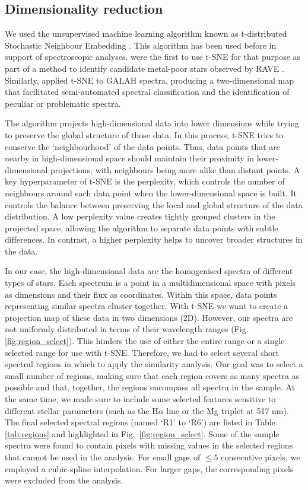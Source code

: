\documentclass{aa}
\begin{document}
\subsection{Dimensionality reduction}

We used the unsupervised machine learning algorithm known as t-distributed Stochastic Neighbour Embedding \cite[t-SNE,][]{JMLR:v9:vandermaaten08a}. This algorithm has been used before in support of spectroscopic analyses. \citet{Matijevic2017} were the first to use t-SNE for that purpose as part of a method to identify candidate metal-poor stars observed by RAVE \cite[The Radial Velocity Experiment,][]{Steinmetz2020}. Similarly, \citet{Traven2017} applied t-SNE to GALAH spectra, producing a two-dimensional map that facilitated semi-automated spectral classification and the identification of peculiar or problematic spectra. 

The algorithm projects high-dimensional data into lower dimensions while trying to preserve the global structure of those data. In this process, t-SNE tries to conserve the `neighbourhood' of the data points. Thus, data points that are nearby in high-dimensional space should maintain their proximity in lower-dimensional projections, with neighbours being more alike than distant points. A key hyperparameter of t-SNE is the perplexity, which controls the number of neighbours around each data point when the lower-dimensional space is built. It controls the balance between preserving the local and global structure of the data distribution. A low perplexity value creates tightly grouped clusters in the projected space, allowing the algorithm to separate data points with subtle differences. In contrast, a higher perplexity helps to uncover broader structures in the data.

In our case, the high-dimensional data are the homogenised spectra of different types of stars. Each spectrum is a point in a multidimensional space with pixels as dimensions and their flux as coordinates. Within this space, data points representing similar spectra cluster together. With t-SNE we want to create a projection map of these data in two dimensions (2D). However, our spectra are not uniformly distributed in terms of their wavelength ranges (Fig. \ref{fig:region_select}). This hinders the use of either the entire range or a single selected range for use with t-SNE. Therefore, we had to select several short spectral regions in which to apply the similarity analysis. Our goal was to select a small number of regions, making sure that each region covers as many spectra as possible and that, together, the regions encompass all spectra in the sample. At the same time, we made sure to include some selected features sensitive to different stellar parameters (such as the H$\alpha$ line or the Mg triplet at 517 nm). The final selected spectral regions (named `R1' to `R6') are listed in Table \ref{tab:regions} and highlighted in Fig.\ \ref{fig:region_select}. Some of the sample spectra were found to contain pixels with missing values in the selected regions that cannot be used in the analysis. For small gaps of $\leq 5$ consecutive pixels, we employed a cubic-spline interpolation. For larger gaps, the corresponding pixels were excluded from the analysis.
\end{document}

